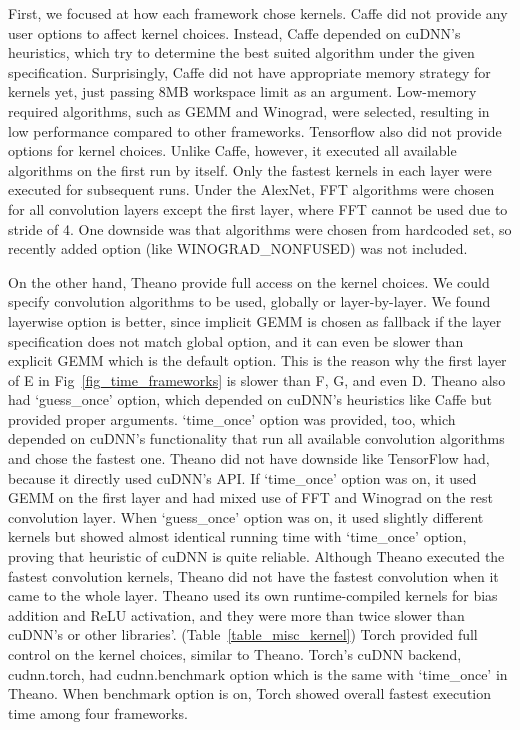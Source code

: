 First, we focused at how each framework chose kernels.
Caffe did not provide any user options to affect kernel choices.
Instead, Caffe depended on cuDNN's heuristics, which try to determine the best suited algorithm under the given specification.
Surprisingly, Caffe did not have appropriate memory strategy for kernels yet, just passing 8MB workspace limit as an argument.
Low-memory required algorithms, such as GEMM and Winograd, were selected, resulting in low performance compared to other frameworks.
Tensorflow also did not provide options for kernel choices.
Unlike Caffe, however, it executed all available algorithms on the first run by itself.
Only the fastest kernels in each layer were executed for subsequent runs.
Under the AlexNet, FFT algorithms were chosen for all convolution layers except the first layer, where FFT cannot be used due to stride of 4.
One downside was that algorithms were chosen from hardcoded set, so recently added option (like WINOGRAD\_NONFUSED) was not included.

On the other hand, Theano provide full access on the kernel choices.
We could specify convolution algorithms to be used, globally or layer-by-layer.
We found layerwise option is better, since implicit GEMM is chosen as fallback if the layer specification does not match global option, and it can even be slower than explicit GEMM which is the default option.
This is the reason why the first layer of E in Fig~\ref{fig_time_frameworks} is slower than F, G, and even D.
Theano also had `guess\_once' option, which depended on cuDNN's heuristics like Caffe but provided proper arguments.
`time\_once' option was provided, too, which depended on cuDNN's functionality that run all available convolution algorithms and chose the fastest one.
Theano did not have downside like TensorFlow had, because it directly used cuDNN's API\@.
If `time\_once' option was on, it used GEMM on the first layer and had mixed use of FFT and Winograd on the rest convolution layer.
When `guess\_once' option was on, it used slightly different kernels but showed almost identical running time with `time\_once' option, proving that heuristic of cuDNN is quite reliable.
Although Theano executed the fastest convolution kernels, Theano did not have the fastest convolution when it came to the whole layer.
Theano used its own runtime-compiled kernels for bias addition and ReLU activation, and they were more than twice slower than cuDNN's or other libraries'. (Table~\ref{table_misc_kernel})
Torch provided full control on the kernel choices, similar to Theano.
Torch's cuDNN backend, cudnn.torch, had cudnn.benchmark option which is the same with `time\_once' in Theano.
When benchmark option is on, Torch showed overall fastest execution time among four frameworks.

